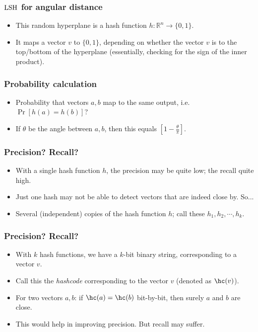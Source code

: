 \documentclass{beamer}
\begin{document}
\begin{frame}
\frametitle{$\mathrm{LSH}$ for angular distance}
\begin{itemize}
\item This random hyperplane is a hash function $h: \mathbb{R}^n \rightarrow \{0, 1\}$. 
\item It maps a vector $v$ to $\{0, 1\}$, depending on whether the vector $v$ is to the top/bottom of the hyperplane (essentially, checking for the sign of the inner product).
\end{itemize}
\end{frame}

\begin{frame}
\frametitle{Probability calculation}
\begin{itemize}
\item Probability that vectors $a, b$ map to the same output, i.e. $\Pr\left[h(a) = h(b)\right]$?
\pause
\item If $\theta$ be the angle between $a, b$, then this equals $\left[1 - \frac{\theta}{\pi}\right]$.
\end{itemize}
\end{frame}

\begin{frame}
\frametitle{Precision? Recall?}
\begin{itemize}
\item With a single hash function $h$, the precision may be quite low; the recall quite high. 
\item Just one hash may not be able to detect vectors that are indeed close by. So...
\pause
\item Several (independent) copies of the hash function $h$; call these $h_1, h_2, \cdots, h_k$.  
\end{itemize}
\end{frame}

\begin{frame}
\frametitle{Precision? Recall?}
\begin{itemize}
\item With $k$ hash functions, we have a $k$-bit binary string, corresponding to a vector $v$.
\item Call this the \textit{hashcode} corresponding to the vector $v$ (denoted as $\hc(v)$). 
\item For two vectors $a, b$: if $\hc(a) = \hc(b)$ bit-by-bit, then surely $a$ and $b$ are close. 
\pause
\item This would help in improving precision. But recall may suffer.
\end{itemize}
\end{frame}
\end{document}
